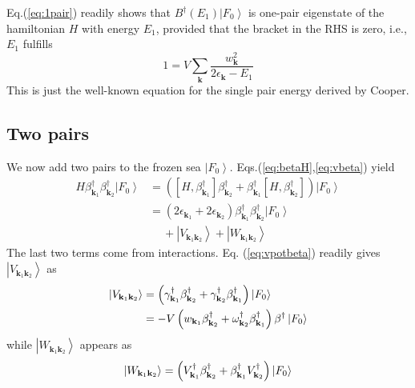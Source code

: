 \documentclass[aps,prb,superscriptaddress,showpacs,reprint,lengthcheck]{revtex4-1}
\newcommand{\vk}{\ensuremath{\mathbf{k}}}
\begin{document}
Eq.(\ref{eq:1pair}) readily shows that  $B^{\dagger}(%
E _1)\left|F_0\right> $ is  one-pair eigenstate of the hamiltonian $H$ with energy  $%
E _1$, provided that the bracket in the RHS is zero, i.e., $E_1$  fulfills
\begin{equation}  \label{eq:SchOne}
1=V\sum_\vk{\frac{w_\vk^2}{2\epsilon_\vk-E _1}}
\end{equation}
This is just the well-known equation for the single pair energy
derived by Cooper.

\subsection{Two pairs}

We now add two pairs to the frozen sea $\left|F_0\right>$. Eqs.(\ref{eq:betaH},\ref{eq:vbeta}) yield 
\begin{equation}  \label{eq:SchTwo}
\begin{split}
H\beta^{\dagger}_{\mathbf{k} _1}\beta^{\dagger}_{\mathbf{k}
_2}\left|F_0\right>   &=\left(\left[H,\beta^{\dagger}_{\mathbf{k} _1}\right]
\beta^{\dagger}_{\mathbf{k} _2}+\beta^{\dagger}_{\mathbf{k} _1}\left[%
H,\beta^{\dagger}_{\mathbf{k} _2}\right]  \right) \left|F_0\right>   \\
&=\left(2\epsilon_{\mathbf{k} _1}+2\epsilon_{\mathbf{k} _2}\right)
\beta^{\dagger}_{\mathbf{k} _1}\beta^{\dagger}_{\mathbf{k}
_2}\left|F_0\right>\\
&\quad\:   +\left|V_{\mathbf{k} _1\mathbf{k} _2}\right>+\left|W_{\mathbf{k} _1\mathbf{k} _2}\right>  
\end{split}%
\end{equation}
The last two terms come from interactions. Eq. (\ref{eq:vpotbeta}) readily gives $\left|V_{\mathbf{k} _1\mathbf{k} _2}\right> $ as 
\begin{equation}
\begin{split}
\left|V_{\mathbf{k} _1\mathbf{k} _2}\right>& =\left(\gamma^{\dagger}_{\mathbf{%
k} _1}\beta^{\dagger}_{\mathbf{k} _2}+\gamma^{\dagger}_{\mathbf{k}
_2}\beta^{\dagger}_{\mathbf{k} _1}\right) \left|F_0\right> \\
&=-V\left(w_{\mathbf{k} _1}\beta^{\dagger}_{\mathbf{k} _2}+\omega^{\dagger}_{\mathbf{k}
_2}\beta^{\dagger}_{\mathbf{k} _1}\right)\beta^\dagger \left|F_0\right>  
\end{split}
\end{equation}
while  $\left|W_{\mathbf{k} _1\mathbf{k} _2}\right> $ appears as 
\begin{equation}
\left|W_{\mathbf{k} _1\mathbf{k} _2}\right> =\left(V^{\dagger}_{\mathbf{%
k} _1}\beta^{\dagger}_{\mathbf{k} _2}+\beta^{\dagger}_{\mathbf{k}
_1}V^{\dagger}_{\mathbf{k} _2}\right) \left|F_0\right> 
\end{equation}
\end{document}

